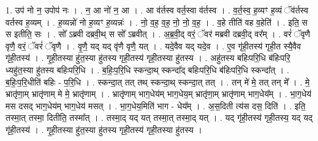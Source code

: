 \documentclass[17pt]{extarticle}
\begin{document}
1. उप॑ नो न॒ उपोप॑ नः । . न॒ आ नो॑ न॒ आ । . आ व॑र्तस्व वर्त॒स्वा व॑र्तस्व । . व॒र्त॒स्व॒ ह॒व्यꣳ ह॒व्यं ॅव॑र्तस्व वर्तस्व ह॒व्यम् । . ह॒व्यन्नो॑ नो ह॒व्यꣳ ह॒व्यन्नः॑ । . नो॒ व॒ह॒ व॒ह॒ नो॒ नो॒ व॒ह॒ । . व॒हे तीति॑ वह व॒हेति॑ । . इति॒ स स इतीति॒ सः । . सो᳚ ऽब्रवी दब्रवी॒थ् स सो᳚ ऽब्रवीत् । . अ॒ब्र॒वी॒द् वरं॒ ॅवर॑ मब्रवी दब्रवी॒द् वर᳚म् । . वरं॑ ॅवृणै वृणै॒ वरं॒ ॅवरं॑ ॅवृणै । . वृ॒णै॒ यद् यद् वृ॑णै वृणै॒ यत् । . यदे॒वैव यद् यदे॒व । . ए॒व गृ॑ही॒तस्य॑ गृही॒त स्यै॒वैव गृ॑ही॒तस्य॑ । . गृ॒ही॒तस्या हु॑त॒स्या हु॑तस्य गृही॒तस्य॑ गृही॒तस्या हु॑तस्य । . अहु॑तस्य बहिःपरि॒धि ब॑हिःपरि॒ ध्यहु॑त॒स्या हु॑तस्य बहिःपरि॒धि । . ब॒हिः॒प॒रि॒धि स्कन्दा॒थ् स्कन्दा᳚द् बहिःपरि॒धि ब॑हिःपरि॒धि स्कन्दा᳚त् । . ब॒हिः॒प॒रि॒धीति॑ बहिः - प॒रि॒धि । . स्कन्दा॒त् तत् तथ् स्कन्दा॒थ् स्कन्दा॒त् तत् । . तन् मे॑ मे॒ तत् तन् मे᳚ । . मे॒ भ्रातृ॑णा॒म् भ्रातृ॑णाम् मे मे॒ भ्रातृ॑णाम् । . भ्रातृ॑णाम् भाग॒धेय॑म् भाग॒धेय॒म् भ्रातृ॑णा॒म् भ्रातृ॑णाम् भाग॒धेय᳚म् । . भा॒ग॒धेय॑ मस दसद् भाग॒धेय॑म् भाग॒धेय॑ मसत् । . भा॒ग॒धेय॒मिति॑ भाग - धेय᳚म् । . अ॒स॒दिती त्य॑स दस॒ दिति॑ । . इति॒ तस्मा॒त् तस्मा॒ दितीति॒ तस्मा᳚त् । . तस्मा॒द् यद् यत् तस्मा॒त् तस्मा॒द् यत् । . यद् गृ॑ही॒तस्य॑ गृही॒तस्य॒ यद् यद् गृ॑ही॒तस्य॑ । . गृ॒ही॒तस्या हु॑त॒स्या हु॑तस्य गृही॒तस्य॑ गृही॒तस्या हु॑तस्य । \newline
\end{document}
